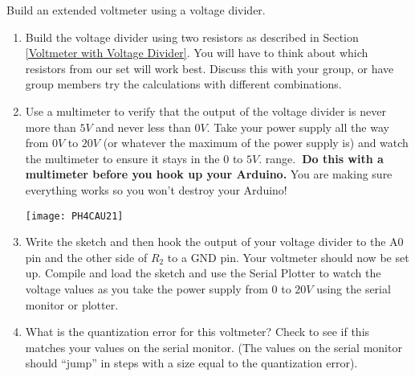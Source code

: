 \clearpage
\activity
{
Build an extended voltmeter using a voltage divider.

\begin{enumerate}
\item Build the voltage divider using two resistors as described in Section
\ref{Voltmeter with Voltage Divider}. You will have to think about which
resistors from our set will work best. Discuss this with your group, or have
group members try the calculations with different combinations.

\item Use a multimeter to verify that the output of the voltage divider is
never more than $5\unit{V}$ and never less than $0\unit{V}.$ Take your power
supply all the way from $0\unit{V}$ to $20\unit{V}$ (or whatever
the maximum of the power supply is) and watch the multimeter
to ensure it stays in the $0$ to $5\unit{V}.$ range.\textbf{\ Do this with a
multimeter before you hook up your Arduino.} You are making sure everything
works so you won't destroy your Arduino!

\begin{center}
\texttt{[image: PH4CAU21]}
\end{center}
\item Write the sketch and then hook
the output of your voltage divider to the A0 pin and the other side of $%
R_{2} $ to a GND pin.
Your voltmeter should now be set
up. Compile and load the sketch and use the Serial Plotter to watch the
voltage values as you take the power supply from $0$ to $20\unit{V}$ using
the serial monitor or plotter.

\item What is the quantization error for this voltmeter? Check to see if
	this matches your values on the serial monitor. (The values on the
		serial monitor should ``jump'' in steps with a size equal to
		the quantization error).
\end{enumerate}
}
